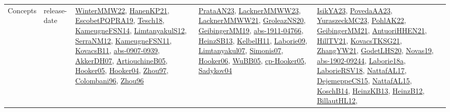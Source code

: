 {\begin{longtable}{lp{3cm}>{\raggedright}p{6cm}>{\raggedright}p{6cm}p{8cm}}
Concepts & release-date & \href{papers/WinterMMW22.pdf}{WinterMMW22}\cite{WinterMMW22}, \href{papers/HanenKP21.pdf}{HanenKP21}\cite{HanenKP21}, \href{articles/EscobetPQPRA19.pdf}{EscobetPQPRA19}\cite{EscobetPQPRA19}, \href{papers/Tesch18.pdf}{Tesch18}\cite{Tesch18}, \href{articles/KameugneFSN14.pdf}{KameugneFSN14}\cite{KameugneFSN14}, \href{articles/LimtanyakulS12.pdf}{LimtanyakulS12}\cite{LimtanyakulS12}, \href{papers/SerraNM12.pdf}{SerraNM12}\cite{SerraNM12}, \href{papers/KameugneFSN11.pdf}{KameugneFSN11}\cite{KameugneFSN11}, \href{articles/KovacsB11.pdf}{KovacsB11}\cite{KovacsB11}, \href{articles/abs-0907-0939.pdf}{abs-0907-0939}\cite{abs-0907-0939}, \href{papers/AkkerDH07.pdf}{AkkerDH07}\cite{AkkerDH07}, \href{papers/ArtiouchineB05.pdf}{ArtiouchineB05}\cite{ArtiouchineB05}, \href{articles/Hooker05.pdf}{Hooker05}\cite{Hooker05}, \href{papers/Hooker04.pdf}{Hooker04}\cite{Hooker04}, \href{articles/Zhou97.pdf}{Zhou97}\cite{Zhou97}, \href{papers/Colombani96.pdf}{Colombani96}\cite{Colombani96}, \href{papers/Zhou96.pdf}{Zhou96}\cite{Zhou96} & \href{articles/PrataAN23.pdf}{PrataAN23}\cite{PrataAN23}, \href{articles/LacknerMMWW23.pdf}{LacknerMMWW23}\cite{LacknerMMWW23}, \href{papers/LacknerMMWW21.pdf}{LacknerMMWW21}\cite{LacknerMMWW21}, \href{papers/GroleazNS20.pdf}{GroleazNS20}\cite{GroleazNS20}, \href{papers/GeibingerMM19.pdf}{GeibingerMM19}\cite{GeibingerMM19}, \href{articles/abs-1911-04766.pdf}{abs-1911-04766}\cite{abs-1911-04766}, \href{articles/HeinzSB13.pdf}{HeinzSB13}\cite{HeinzSB13}, \href{articles/KelbelH11.pdf}{KelbelH11}\cite{KelbelH11}, \href{papers/Laborie09.pdf}{Laborie09}\cite{Laborie09}, \href{papers/Limtanyakul07.pdf}{Limtanyakul07}\cite{Limtanyakul07}, \href{articles/Simonis07.pdf}{Simonis07}\cite{Simonis07}, \href{articles/Hooker06.pdf}{Hooker06}\cite{Hooker06}, \href{papers/WuBB05.pdf}{WuBB05}\cite{WuBB05}, \href{papers/cp-Hooker05.pdf}{cp-Hooker05}\cite{cp-Hooker05}, \href{papers/Sadykov04.pdf}{Sadykov04}\cite{Sadykov04} & \href{articles/IsikYA23.pdf}{IsikYA23}\cite{IsikYA23}, \href{papers/PovedaAA23.pdf}{PovedaAA23}\cite{PovedaAA23}, \href{papers/YuraszeckMC23.pdf}{YuraszeckMC23}\cite{YuraszeckMC23}, \href{articles/PohlAK22.pdf}{PohlAK22}\cite{PohlAK22}, \href{papers/GeibingerMM21.pdf}{GeibingerMM21}\cite{GeibingerMM21}, \href{papers/AntuoriHHEN21.pdf}{AntuoriHHEN21}\cite{AntuoriHHEN21}, \href{papers/HillTV21.pdf}{HillTV21}\cite{HillTV21}, \href{papers/KovacsTKSG21.pdf}{KovacsTKSG21}\cite{KovacsTKSG21}, \href{articles/ZhangYW21.pdf}{ZhangYW21}\cite{ZhangYW21}, \href{papers/GodetLHS20.pdf}{GodetLHS20}\cite{GodetLHS20}, \href{articles/Novas19.pdf}{Novas19}\cite{Novas19}, \href{articles/abs-1902-09244.pdf}{abs-1902-09244}\cite{abs-1902-09244}, \href{papers/Laborie18a.pdf}{Laborie18a}\cite{Laborie18a}, \href{articles/LaborieRSV18.pdf}{LaborieRSV18}\cite{LaborieRSV18}, \href{articles/NattafAL17.pdf}{NattafAL17}\cite{NattafAL17}, \href{papers/DejemeppeCS15.pdf}{DejemeppeCS15}\cite{DejemeppeCS15}, \href{articles/NattafAL15.pdf}{NattafAL15}\cite{NattafAL15}, \href{papers/KoschB14.pdf}{KoschB14}\cite{KoschB14}, \href{papers/HeinzKB13.pdf}{HeinzKB13}\cite{HeinzKB13}, \href{papers/HeinzB12.pdf}{HeinzB12}\cite{HeinzB12}, \href{papers/BillautHL12.pdf}{BillautHL12}\cite{BillautHL12}, 
\end{longtable}}
